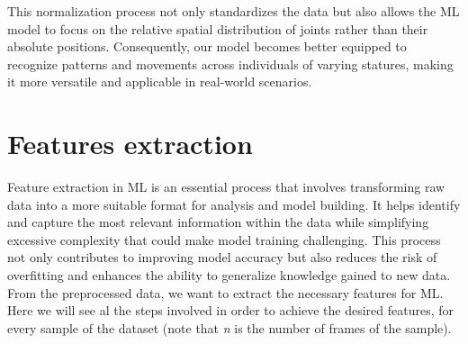This normalization process not only standardizes the data but also allows the ML model to focus on the relative spatial distribution of joints rather than their absolute positions.
Consequently, our model becomes better equipped to recognize patterns and movements across individuals of varying statures, making it more versatile and applicable in real-world scenarios. \\

\section{Features extraction}
Feature extraction in ML is an essential process that involves transforming raw data into a more suitable format for analysis and model building.
It helps identify and capture the most relevant information within the data while simplifying excessive complexity that could make model training challenging.
This process not only contributes to improving model accuracy but also reduces the risk of overfitting and enhances the ability to generalize knowledge gained to new data. \\
From the preprocessed data, we want to extract the necessary features for ML.
Here we will see al the steps involved in order to achieve the desired features, for every sample of the dataset (note that \textit{n} is the number of frames of the sample). \\

